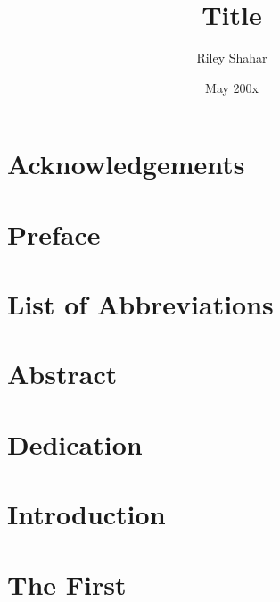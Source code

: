 \documentclass[12pt,twoside]{reedthesis}
\title{Title} %
\author{Riley Shahar}
\date{May 200x} %
\begin{document}
\maketitle
\frontmatter
\pagestyle{empty} %

\chapter*{Acknowledgements}

\chapter*{Preface}

\chapter*{List of Abbreviations}

\tableofcontents
\listoftables
\listoffigures

\chapter*{Abstract}

\chapter*{Dedication}

\mainmatter %
\pagestyle{fancyplain} %

\chapter*{Introduction}

\chapter{The First}

\backmatter %

\nocite{*}



\end{document}
